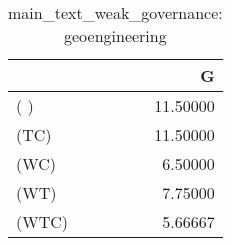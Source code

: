 \begin{table}
\centering
\caption{main_text_weak_governance: geoengineering}
\begin{tabular}{lr}
\toprule
{} &        G \\
\midrule
( )   & 11.50000 \\
(TC)  & 11.50000 \\
(WC)  &  6.50000 \\
(WT)  &  7.75000 \\
(WTC) &  5.66667 \\
\bottomrule
\end{tabular}
\end{table}
